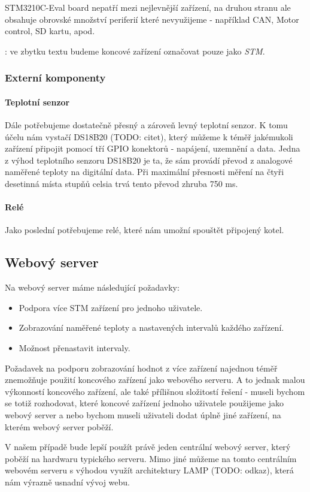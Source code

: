 STM3210C-Eval board nepatří mezi nejlevnější zařízení, na druhou stranu ale obsahuje obrovské
množství periferií které nevyužijeme - například CAN, Motor control, SD kartu, apod.

: ve zbytku textu budeme koncové zařízení označovat pouze jako \emph{STM}.

\subsubsection{Externí komponenty}
\paragraph{Teplotní senzor}
Dále potřebujeme dostatečně přesný a zároveň levný teplotní senzor.
K tomu účelu nám vystačí DS18B20 (TODO: citet), který můžeme k téměř jakémukoli zařízení připojit pomocí tří
GPIO konektorů - napájení, uzemnění a data.
Jedna z výhod teplotního senzoru DS18B20 je ta, že sám provádí převod z analogové naměřené
teploty na digitální data.
Při maximální přesnosti měření na čtyři desetinná místa stupňů celsia trvá tento převod zhruba
750 ms.

\paragraph{Relé}
Jako poslední potřebujeme relé, které nám umožní spouštět připojený kotel.


\subsection{Webový server}
Na webový server máme následující požadavky:
\begin{itemize}
  \item Podpora více STM zařízení pro jednoho uživatele.
  \item Zobrazování naměřené teploty a nastavených intervalů každého zařízení.
  \item Možnost přenastavit intervaly.
\end{itemize}

Požadavek na podporu zobrazování hodnot z více zařízení najednou téměř znemožňuje použití koncového
zařízení jako webového serveru.
A to jednak malou výkonností koncového zařízení, ale také přílišnou složitostí řešení - museli bychom
se totiž rozhodovat, které koncové zařízení jednoho uživatele použijeme jako webový server a nebo bychom
museli uživateli dodat úplně jiné zařízení, na kterém webový server poběží.

V našem případě bude lepší použít právě jeden centrální webový server, který poběží na hardwaru typického
serveru.
Mimo jiné můžeme na tomto centrálním webovém serveru s výhodou využít architektury LAMP (TODO: odkaz),
která nám výrazně usnadní vývoj webu.
